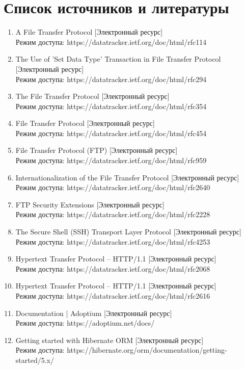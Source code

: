 \documentclass[a4paper,14pt]{extarticle}
\begin{document}
\section{Список источников и литературы}
\begin{enumerate}
    \item A File Transfer Protocol [Электронный ресурс] \\Режим доступа: https://datatracker.ietf.org/doc/html/rfc114
    \item The Use of 'Set Data Type' Transaction in File Transfer Protocol [Электронный ресурс] \\Режим доступа: https://datatracker.ietf.org/doc/html/rfc294
    \item The File Transfer Protocol [Электронный ресурс] \\Режим доступа: https://datatracker.ietf.org/doc/html/rfc354
    \item File Transfer Protocol [Электронный ресурс] \\Режим доступа: https://datatracker.ietf.org/doc/html/rfc454
    \item File Transfer Protocol (FTP) [Электронный ресурс] \\Режим доступа: https://datatracker.ietf.org/doc/html/rfc959
    \item Internationalization of the File Transfer Protocol [Электронный ресурс] \\Режим доступа: https://datatracker.ietf.org/doc/html/rfc2640
    \item FTP Security Extensions [Электронный ресурс] \\Режим доступа: https://datatracker.ietf.org/doc/html/rfc2228
    \item The Secure Shell (SSH) Transport Layer Protocol [Электронный ресурс] \\Режим доступа: https://datatracker.ietf.org/doc/html/rfc4253
    \item Hypertext Transfer Protocol -- HTTP/1.1 [Электронный ресурс] \\Режим доступа: https://datatracker.ietf.org/doc/html/rfc2068
    \item Hypertext Transfer Protocol -- HTTP/1.1 [Электронный ресурс] \\Режим доступа: https://datatracker.ietf.org/doc/html/rfc2616
    \item Documentation | Adoptium [Электронный ресурс] \\Режим доступа: https://adoptium.net/docs/
    \item Getting started with Hibernate ORM [Электронный ресурс] \\Режим доступа: https://hibernate.org/orm/documentation/getting-started/5.x/

\end{enumerate}
\end{document}
